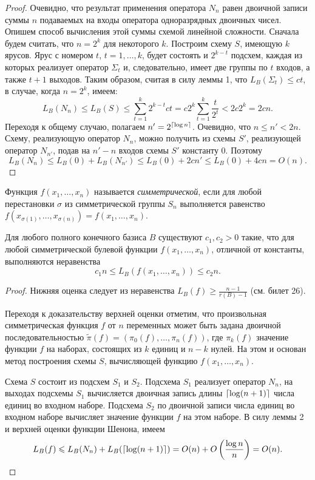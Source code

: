 \begin{proof}
    Очевидно, что результат применения оператора $N_n$ равен двоичной записи суммы $n$ подаваемых на входы оператора одноразрядных двоичных чисел. Опишем способ вычисления этой суммы схемой линейной сложности. Сначала будем считать, что $n = 2^k$ для некоторого $k$. Построим схему $S$, имеющую $k$ ярусов. Ярус с номером $t$, $t = 1,\ldots, k$, будет состоять и $2^{k−t}$ подсхем, каждая из которых реализует оператор $\Sigma_t$ и, следовательно, имеет две группы по $t$ входов, а также $t+1$ выходов. Таким образом, считая в силу леммы 1, что $L_B(\Sigma_t) \leqslant ct$, в случае, когда $n = 2^k$, имеем:
    \[
        L_B(N_n) \leqslant L_B(S) \leqslant \sum_{t=1}^k 2^{k-t}ct = c2^k \sum_{t=1}^k \frac{t}{2^t} < 2c 2^k = 2cn.
    \]
    Переходя к общему случаю, полагаем $n' = 2^{\left\lceil {\log n} \right\rceil}$. Очевидно, что $n \leqslant n' < 2n$. Схему, реализующую оператор $N_n$, можно получить из схемы $S′$, реализующей оператор $N_{n′}$, подав на $n' - n$ входов схемы $S'$ константу 0. Поэтому 
    \[
    L_B(N_n) \leqslant L_B(0) + L_B(N_{n′}) \leqslant L_B(0) + 2cn'
    \leqslant L_B(0) + 4cn = O(n).
    \]
\end{proof}

\begin{definition}
    Функция $f(x_1, \ldots, x_n)$ называется \textit{симметрической}, если для любой перестановки $\sigma$ из симметрической группы $S_n$ выполняется равенство $f(x_{\sigma(1)}, \ldots, x_{\sigma(n)}) = f(x_1, \ldots, x_n)$.
\end{definition}

\begin{theorem}
    Для любого полного конечного базиса $B$ существуют $c_1, c_2 > 0$ такие, что
    для любой симметрической булевой функции $f(x_1, \ldots, x_n)$, отличной от константы, выполняются неравенства
    \[
        c_1n\leqslant L_B(f(x_1, \ldots, x_n)) \leqslant c_2n.
    \]
\end{theorem}

\begin{proof}
    Нижняя оценка следует из неравенства $L_B(f) \geqslant \frac{n-1}{r(B) - 1}$ (см. билет 26).

    Переходя к доказательству верхней оценки отметим, что произвольная симметрическая функция $f$ от $n$ переменных может быть задана двоичной последовательностью $\widetilde{\pi}(f) = (\pi_0(f), \ldots, \pi_n(f))$, где $\pi_k(f)$ значение функции $f$ на наборах, состоящих из $k$ единиц и $n - k$ нулей. На этом и основан метод построения схемы $S$, вычисляющей функцию $f(x_1, \ldots, x_n)$.
    
    Схема $S$ состоит из подсхем $S_1$ и $S_2$. Подсхема $S_1$ реализует оператор $N_n$, на выходах подсхемы $S_1$ вычисляется двоичная запись длины $\left\lceil {\log(n + 1)} \right\rceil$ числа единиц во входном наборе. Подсхема $S_2$ по двоичной записи числа единиц во входном наборе вычисляет значение функции $f$ на этом наборе. В силу леммы 2 и верхней оценки функции Шенона, имеем
    \[
        L_B(f) \leqslant L_B(N_n) + L_B(\left\lceil {\log(n+1)} \right\rceil) = O(n) + O\left(\frac{\log n}{n}\right) = O(n).
    \]
\end{proof}